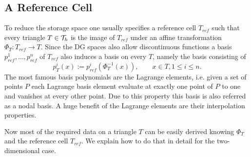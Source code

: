 \subsection{A Reference Cell} \label{subsec: ref cell}
To reduce the storage space one usually specifies a reference cell $T_{ref}$ such that every triangle $T \in \mathcal{T}_h$ is the image of $T_{ref}$ under an affine transformation $\Phi_T:T_{ref} \rightarrow T$. 
Since the DG spaces also allow discontinuous functions a basis $p^1_{ref},\dots,p^n_{ref}$ of $T_{ref}$ also induces a basis on every $T$, namely the basis consisting of 
\[
	p_T^i(x) := p^i_{ref}(\Phi_T^{-1}(x)), \qquad x \in T, 1 \leq i \leq n.
\]
The most famous basis polynomials are the Lagrange elements, i.e. given a set of points $P$ each Lagrange basis element evaluate at exactly one point of $P$ to one and vanishes at every other point. Due to this property this basis is also referred as a nodal basis. 
A huge benefit of the Lagrange elements are their interpolation properties. 

Now most of the required data on a triangle $T$ can be easily derived knowing $\Phi_T$ and the reference cell $T_{ref}$. We explain how to do that in detail for the two-dimensional case.

